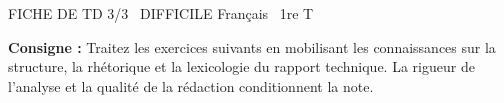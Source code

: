 \documentclass[11pt]{article}
\begin{document}
\begin{tcolorbox}[enhanced,colback=popink,colframe=popink,arc=10pt,boxrule=0pt,left=12pt,right=12pt,top=9pt,bottom=9pt]
{\color{white}\popxbold\small FICHE DE TD 3/3 \textbullet\ DIFFICILE \hfill Français \textbullet\ 1re T\par}
\end{tcolorbox}
\vspace{4pt}
\noindent\textbf{Consigne :} Traitez les exercices suivants en mobilisant les connaissances sur la structure, la rhétorique et la lexicologie du rapport technique. La rigueur de l'analyse et la qualité de la rédaction conditionnent la note.
\end{document}
